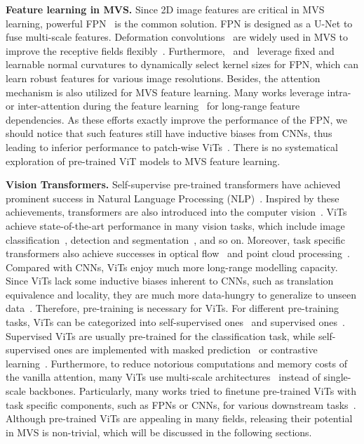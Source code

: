 \documentclass[10pt]{article} \usepackage[preprint]{tmlr}
\begin{document}
\noindent\textbf{Feature learning in MVS.}
Since 2D image features are critical in MVS learning, powerful FPN~\citep{lin2017feature} is the common solution. FPN is designed as a U-Net  to fuse multi-scale features. Deformation convolutions~\citep{dai2017deformable} are widely used in MVS to improve the receptive fields flexibly~\citep{wang2021patchmatchnet,wei2021aa,mi2021generalized,ding2021transmvsnet}. Furthermore,~\citet{Xu_2020_CVPR} and~\citet{giang2021curvature} leverage fixed and learnable normal curvatures to dynamically select kernel sizes for FPN, which can learn robust features for various image resolutions.
Besides, the attention mechanism is also utilized for MVS feature learning. Many works leverage intra- or inter-attention during the feature learning~\citep{yi2020pyramid,zhu2021multi,ding2021transmvsnet} for long-range feature dependencies.
As these efforts exactly improve the performance of the FPN, we should notice that such features still have inductive biases from CNNs, thus leading to inferior performance to patch-wise ViTs~\citep{dosovitskiy2020image}. There is no systematical exploration of pre-trained ViT models to MVS feature learning.


\noindent\textbf{Vision Transformers.}
Self-supervise pre-trained transformers have achieved prominent success in Natural Language Processing (NLP)~\citep{vaswani2017attention,devlin2018bert,brown2020language}. Inspired by these achievements, transformers are also introduced into the computer vision~\citep{dosovitskiy2020image,liu2021swin,he2021masked}. 
ViTs achieve state-of-the-art performance in many vision tasks, which include image classification~\citep{dosovitskiy2020image,liu2021swin}, detection and segmentation~\citep{zheng2021rethinking,li2022exploring}, and so on. 
Moreover, task specific transformers also achieve successes in optical flow~\citep{huang2022flowformer} and point cloud processing~\citep{guo2021pct,zhao2021point}.
Compared with CNNs, ViTs enjoy much more long-range modelling capacity. Since ViTs lack some inductive biases inherent to CNNs, such as translation equivalence and locality, they are much more data-hungry to generalize to unseen data~\citep{d2021convit,dosovitskiy2020image,xu2021vitae}. Therefore, pre-training is necessary for ViTs. 
For different pre-training tasks, ViTs can be categorized into self-supervised ones~\citep{bao2021beit,he2021masked,caron2021emerging} and supervised ones~\citep{dosovitskiy2020image,liu2021swin,chu2021twins}. Supervised ViTs are usually pre-trained for the classification task, while self-supervised ones are implemented with masked prediction~\citep{he2021masked,bao2021beit} or contrastive learning~\citep{caron2021emerging,Chen_2021_ICCV}. Furthermore, to reduce notorious computations and memory costs of the vanilla attention, many ViTs use multi-scale architectures~\citep{liu2021swin,wang2021pyramid,chu2021twins} instead of single-scale backbones. Particularly, many works tried to finetune pre-trained ViTs with task specific components, such as FPNs or CNNs, for various downstream tasks~\citep{li2022exploring,huang2022flowformer,chen2021pre}.
Although pre-trained ViTs are appealing in many fields, releasing their potential in MVS is non-trivial, which will be discussed in the following sections.
\end{document}
